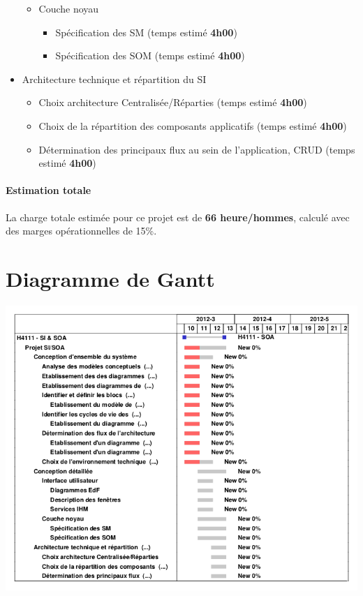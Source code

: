 \begin{itemize}
\begin{itemize}
\item Couche noyau

\begin{itemize}
\item Spécification des SM (temps estimé \textbf{4h00})
\item Spécification des SOM (temps estimé \textbf{4h00})
\end{itemize}

\end{itemize}

\item Architecture technique et répartition du SI

\begin{itemize}
\item Choix architecture Centralisée/Réparties (temps estimé \textbf{4h00})
\item Choix de la répartition des composants applicatifs (temps estimé \textbf{4h00})
\item Détermination des principaux flux au sein de l'application, CRUD (temps estimé \textbf{4h00})
\end{itemize}

\end{itemize}

\paragraph{Estimation totale} La charge totale estimée pour ce projet est de \textbf{66 heure/hommes}, calculé avec des marges opérationnelles de 15\%.

\section{Diagramme de Gantt}

\begin {center}
\includegraphics[width=\textwidth]{gantt.png}
\end {center}
